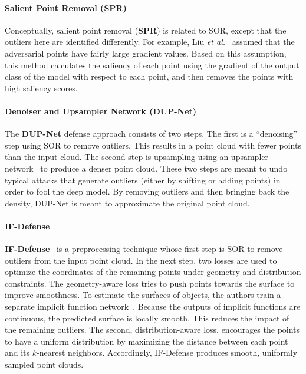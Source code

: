 \documentclass{ieeeaccess}
\def\etal{\textit{et al.}}
\begin{document}
\paragraph{Salient Point Removal (SPR)}
\label{sec:Salient points removal}
Conceptually, salient point removal (\textbf{SPR}) is related to SOR, except that the outliers here are identified differently. %
For example, Liu \etal~\cite{liu2019extending} assumed that the adversarial points have fairly large gradient values. Based on this assumption, %
this method calculates the saliency of each point using the gradient of the output class of the model %
with respect to each point, and then removes the points with high saliency scores. %

\paragraph{Denoiser and Upsampler Network (DUP-Net)}
\label{sec:DUP-Net}
The \textbf{DUP-Net} defense approach consists of two steps. The first is a ``denoising'' step using SOR to remove outliers. %
This results in a point cloud with fewer points than the input cloud. The second step is upsampling using %
an upsampler network~\cite{yu2018pu} to produce a denser point cloud. These two steps are meant to undo typical attacks that generate outliers (either by shifting or adding points) in order to fool the deep model. By removing outliers and then bringing back the density, DUP-Net is meant to approximate the original point cloud. %


\paragraph{IF-Defense}
\label{sec:IF-Defense}
\textbf{IF-Defense}~\cite{wu2020if} is a preprocessing technique %
whose first step is SOR to remove outliers from the input point cloud.
In the next step, two losses are used to optimize the coordinates of the remaining points under geometry and distribution constraints.
The geometry-aware loss tries to push points towards the surface to improve smoothness. To estimate the surfaces of objects, the authors train a separate implicit function network~\cite{peng2020convolutional,mescheder2019occupancy}. %
Because the outputs of implicit functions are continuous, the predicted surface is locally smooth. This reduces the impact of the remaining outliers.
The second, distribution-aware loss, encourages the points to have a uniform distribution by maximizing the distance between each point and its $k$-nearest neighbors. Accordingly, IF-Defense produces smooth, uniformly sampled point clouds. %
\end{document}
